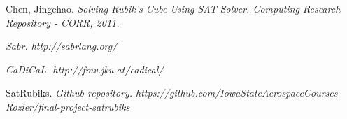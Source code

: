 \documentclass{article}
\begin{document}
\newpage

\begin{thebibliography}{9}
Chen, Jingchao. 
\textit{{Solving Rubik's Cube Using SAT Solver}. 
Computing Research Repository - CORR, 2011.}

\textit{{Sabr}. 
http://sabrlang.org/}

\textit{{CaDiCaL}. 
http://fmv.jku.at/cadical/}

SatRubiks.
\textit{{Github repository}.
https://github.com/IowaStateAerospaceCourses-Rozier/final-project-satrubiks}
\end{thebibliography}
\end{document}
